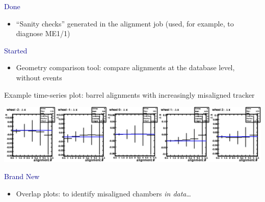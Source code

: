 \documentclass[compress]{beamer}
\begin{document}
\begin{frame}

{\large \textcolor{darkblue}{Done}}
\begin{itemize}
\item ``Sanity checks'' generated in the alignment job (used,
for example, to diagnose ME1/1)
\end{itemize}

{\large \textcolor{darkblue}{Started}}
\begin{itemize}
\item Geometry comparison tool: compare alignments at the database level, without events
\end{itemize}

\vspace{0.2 cm}
Example time-series plot: barrel alignments with increasingly misaligned tracker
\begin{center}
\includegraphics[width=0.9\linewidth]{c_barrel_dxloc.png}
\end{center}

{\large \textcolor{darkblue}{Brand New}}
\begin{itemize}
\item Overlap plots: to identify misaligned chambers {\it in data}\ldots
\end{itemize}
\end{frame}
\end{document}
